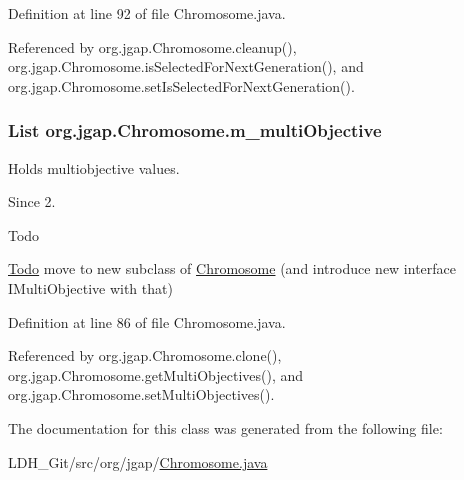 Definition at line 92 of file Chromosome.\-java.



Referenced by org.\-jgap.\-Chromosome.\-cleanup(), org.\-jgap.\-Chromosome.\-is\-Selected\-For\-Next\-Generation(), and org.\-jgap.\-Chromosome.\-set\-Is\-Selected\-For\-Next\-Generation().

\hypertarget{classorg_1_1jgap_1_1_chromosome_a6d73c5e40fce0219e80021211d4a2d57}{
\subsubsection[{m\-\_\-multi\-Objective}]{\setlength{\rightskip}{0pt plus 5cm}List org.\-jgap.\-Chromosome.\-m\-\_\-multi\-Objective\hspace{0.3cm}{\ttfamily [private]}}}\label{classorg_1_1jgap_1_1_chromosome_a6d73c5e40fce0219e80021211d4a2d57}
Holds multiobjective values.

\begin{DoxySince}{Since}
2. 
\end{DoxySince}
\begin{DoxyRefDesc}{Todo}
\item[\hyperlink{todo__todo000048}{Todo}]move to new subclass of \hyperlink{classorg_1_1jgap_1_1_chromosome}{Chromosome} (and introduce new interface I\-Multi\-Objective with that) \end{DoxyRefDesc}


Definition at line 86 of file Chromosome.\-java.



Referenced by org.\-jgap.\-Chromosome.\-clone(), org.\-jgap.\-Chromosome.\-get\-Multi\-Objectives(), and org.\-jgap.\-Chromosome.\-set\-Multi\-Objectives().



The documentation for this class was generated from the following file\-:\begin{DoxyCompactItemize}
\item 
L\-D\-H\-\_\-\-Git/src/org/jgap/\hyperlink{_chromosome_8java}{Chromosome.\-java}\end{DoxyCompactItemize}
